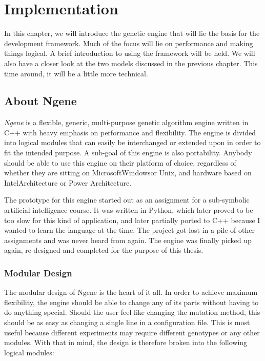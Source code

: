 \section{Implementation}
\label{sec:implementation}
In this chapter, we will introduce the genetic engine that will lie the basis for the development framework. Much of the focus will lie on performance and making things logical. A brief introduction to using the framework will be held. We will also have a closer look at the two models discussed in the previous chapter. This time around, it will be a little more technical.


\subsection{About Ngene}
\emph{Ngene} is a flexible, generic, multi-purpose genetic algorithm engine written in C++ with heavy emphasis on performance and flexibility. The engine is divided into logical modules that can easily be interchanged or extended upon in order to fit the intended purpose. A sub-goal of this engine is also portability. Anybody should be able to use this engine on their platform of choice, regardless of whether they are sitting on Microsoft\textregistered Windows\texttrademark or Unix, and hardware based on Intel\textregistered Architecture or Power Architecture.

The prototype for this engine started out as an assignment for a sub-symbolic artificial intelligence course. It was written in Python, which later proved to be too slow for this kind of application, and later partially ported to C++ because I wanted to learn the language at the time. The project got lost in a pile of other assignments and was never heard from again. The engine was finally picked up again, re-designed and completed for the purpose of this thesis.

\subsubsection{Modular Design}
The modular design of Ngene is the heart of it all. In order to achieve maximum flexibility, the engine should be able to change any of its parts without having to do anything special. Should the user feel like changing the mutation method, this should be as easy as changing a single line in a configuration file. This is most useful because different experiments may require different genotypes or any other modules. With that in mind, the design is therefore broken into the following logical modules:

